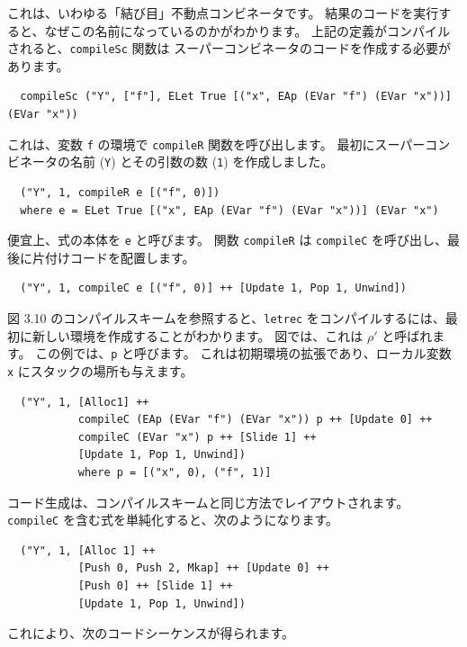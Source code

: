 \documentclass{jbook}
\begin{document}
これは、いわゆる「結び目」不動点コンビネータです。 結果のコードを実行すると、なぜこの名前になっているのかがわかります。
上記の定義がコンパイルされると、\texttt{compileSc} 関数は
スーパーコンビネータのコードを作成する必要があります。

\begin{verbatim}
  compileSc ("Y", ["f"], ELet True [("x", EAp (EVar "f") (EVar "x"))] (EVar "x"))
\end{verbatim}

これは、変数 \texttt{f} の環境で \texttt{compileR} 関数を呼び出します。
最初にスーパーコンビネータの名前 (\texttt{Y}) とその引数の数 (\texttt{1}) を作成しました。

\begin{verbatim}
  ("Y", 1, compileR e [("f", 0)])
  where e = ELet True [("x", EAp (EVar "f") (EVar "x"))] (EVar "x")
\end{verbatim}

便宜上、式の本体を \texttt{e} と呼びます。
関数 \texttt{compileR} は \texttt{compileC} を呼び出し、最後に片付けコードを配置します。

\begin{verbatim}
  ("Y", 1, compileC e [("f", 0)] ++ [Update 1, Pop 1, Unwind])
\end{verbatim}

図 3.10 のコンパイルスキームを参照すると、\texttt{letrec} をコンパイルするには、最初に新しい環境を作成することがわかります。
図では、これは $\rho'$ と呼ばれます。 この例では、\texttt{p} と呼びます。
これは初期環境の拡張であり、ローカル変数 \texttt{x} にスタックの場所も与えます。

\begin{verbatim}
  ("Y", 1, [Alloc1] ++
           compileC (EAp (EVar "f") (EVar "x")) p ++ [Update 0] ++
           compileC (EVar "x") p ++ [Slide 1] ++
           [Update 1, Pop 1, Unwind])
           where p = [("x", 0), ("f", 1)]
\end{verbatim}

コード生成は、コンパイルスキームと同じ方法でレイアウトされます。
\texttt{compileC} を含む式を単純化すると、次のようになります。

\begin{verbatim}
  ("Y", 1, [Alloc 1] ++
           [Push 0, Push 2, Mkap] ++ [Update 0] ++
           [Push 0] ++ [Slide 1] ++
           [Update 1, Pop 1, Unwind])
\end{verbatim}

これにより、次のコードシーケンスが得られます。
\end{document}
